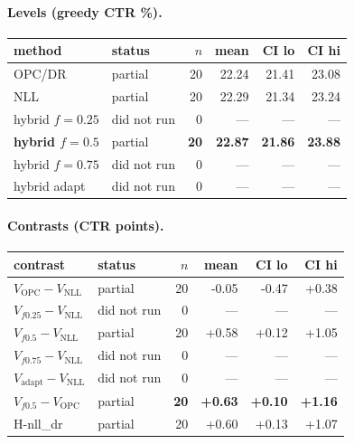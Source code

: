 \documentclass[10pt,a4paper]{article}
\begin{document}
\paragraph{Levels (greedy CTR \%).}
{\centering\small\begin{tabular}{llrrrr}
\toprule method & status & $n$ & mean & CI lo & CI hi \\
\midrule
OPC/DR & partial & 20 & 22.24 & 21.41 & 23.08 \\
NLL & partial & 20 & 22.29 & 21.34 & 23.24 \\
hybrid $f{=}0.25$ & did not run & 0 & --- & --- & --- \\
\textbf{hybrid $f{=}0.5$} & partial & \textbf{20} & \textbf{22.87} & \textbf{21.86} & \textbf{23.88} \\
hybrid $f{=}0.75$ & did not run & 0 & --- & --- & --- \\
hybrid adapt & did not run & 0 & --- & --- & --- \\
\bottomrule\end{tabular}\par}
\paragraph{Contrasts (CTR points).}
{\centering\small\begin{tabular}{llrrrr}
\toprule contrast & status & $n$ & mean & CI lo & CI hi \\
\midrule
$V_{\mathrm{OPC}}-V_{\mathrm{NLL}}$ & partial & 20 & -0.05 & -0.47 & +0.38 \\
$V_{f0.25}-V_{\mathrm{NLL}}$ & did not run & 0 & --- & --- & --- \\
$V_{f0.5}-V_{\mathrm{NLL}}$ & partial & 20 & +0.58 & +0.12 & +1.05 \\
$V_{f0.75}-V_{\mathrm{NLL}}$ & did not run & 0 & --- & --- & --- \\
$V_{\mathrm{adapt}}-V_{\mathrm{NLL}}$ & did not run & 0 & --- & --- & --- \\
\textbf{$V_{f0.5}-V_{\mathrm{OPC}}$} & partial & \textbf{20} & \textbf{+0.63} & \textbf{+0.10} & \textbf{+1.16} \\
H-nll\_dr & partial & 20 & +0.60 & +0.13 & +1.07 \\
\bottomrule\end{tabular}\par}
\end{document}
